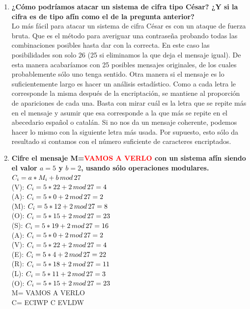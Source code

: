 \documentclass{article}
\begin{document}
\begin{enumerate}
    \item \textbf {¿Cómo podríamos atacar un sistema de cifra tipo César? ¿Y si la cifra es de tipo afín como el de la pregunta anterior?}\\
    Lo más fácil para atacar un sistema de cifra César es con un ataque de fuerza bruta. Que es el método para averiguar una contraseña probando todas las combinaciones posibles hasta dar con la correcta. En este caso las posibilidades son solo 26 (25 si eliminamos la que deja el mensaje igual). De esta manera acabaríamos con 25 posibles mensajes originales, de los cuales probablemente sólo uno tenga sentido. 
    Otra manera si el mensaje es lo suficientemente largo es hacer un análisis estadístico. Como a cada letra le corresponde la misma después de la encriptación, se mantiene al proporción de apariciones de cada una. Basta con mirar cuál es la letra que se repite más en el mensaje y asumir que esa corresponde a la que más se repite en el abecedario español o catalán. Si no nos da un mensaje coherente, podemos hacer lo mismo con la siguiente letra más usada. Por supuesto, esto sólo da resultado si contamos con el número suficiente de caracteres encriptados. 
    
    \item \textbf{Cifre el mensaje M=\textcolor{red}{VAMOS A VERLO} con un sistema afín siendo el valor $a=5$ y $b=2$, usando sólo operaciones modulares.}\\
    $C_{i}=a*M_{i}+b\thinspace mod \thinspace 27$\\
    (V):
    $C_{i}=5*22+2\thinspace mod \thinspace 27 = 4$\\
    (A):
    $C_{i}=5*0+2\thinspace mod \thinspace 27 = 2$\\
    (M):
    $C_{i}=5*12+2\thinspace mod \thinspace 27 = 8$\\
    (O):
    $C_{i}=5*15+2\thinspace mod \thinspace 27 = 23$\\
    (S):
    $C_{i}=5*19+2\thinspace mod \thinspace 27 = 16$\\
    (A):
    $C_{i}=5*0+2\thinspace mod \thinspace 27 = 2$\\
    (V):
    $C_{i}=5*22+2\thinspace mod \thinspace 27 = 4$\\
    (E):
    $C_{i}=5*4+2\thinspace mod \thinspace 27 = 22$\\
    (R):
    $C_{i}=5*18+2\thinspace mod \thinspace 27 = 11$\\
    (L):
    $C_{i}=5*11+2\thinspace mod \thinspace 27 = 3$\\
    (O):
    $C_{i}=5*15+2\thinspace mod \thinspace 27 = 23$\\
    M= VAMOS A VERLO\\
    C= ECIWP C EVLDW
    

\end{enumerate}
\end{document}

